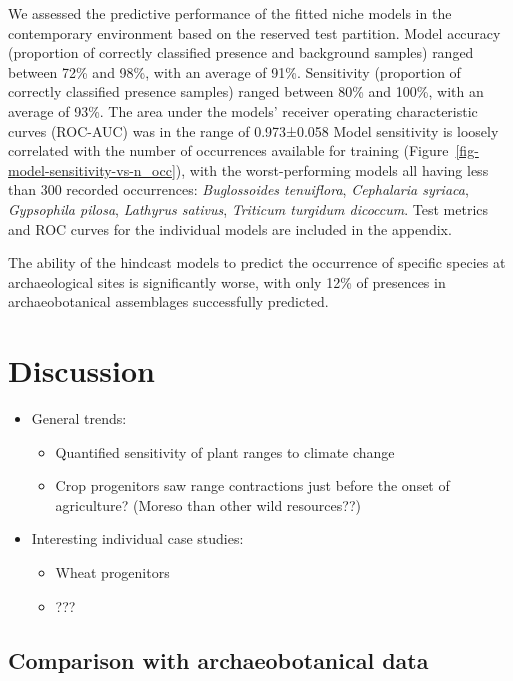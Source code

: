 \documentclass[
  authoryear,
  review]{elsarticle}
\providecommand{\tightlist}{%
  \setlength{\itemsep}{0pt}\setlength{\parskip}{0pt}}\usepackage{longtable,booktabs,array}
\begin{document}
We assessed the predictive performance of the fitted niche models in the
contemporary environment based on the reserved test partition. Model
accuracy (proportion of correctly classified presence and background
samples) ranged between 72\% and 98\%, with an average of 91\%.
Sensitivity (proportion of correctly classified presence samples) ranged
between 80\% and 100\%, with an average of 93\%. The area under the
models' receiver operating characteristic curves (ROC-AUC) was in the
range of 0.973±0.058 Model sensitivity is loosely correlated with the
number of occurrences available for training
(Figure~\ref{fig-model-sensitivity-vs-n_occ}), with the worst-performing
models all having less than 300 recorded occurrences: \emph{Buglossoides
tenuiflora}, \emph{Cephalaria syriaca}, \emph{Gypsophila pilosa},
\emph{Lathyrus sativus}, \emph{Triticum turgidum dicoccum}. Test metrics
and ROC curves for the individual models are included in the appendix.

The ability of the hindcast models to predict the occurrence of specific
species at archaeological sites is significantly worse, with only 12\%
of presences in archaeobotanical assemblages successfully predicted.

\section{Discussion}\label{discussion}

\begin{itemize}
\tightlist
\item
  General trends:

  \begin{itemize}
  \tightlist
  \item
    Quantified sensitivity of plant ranges to climate change
  \item
    Crop progenitors saw range contractions just before the onset of
    agriculture? (Moreso than other wild resources??)
  \end{itemize}
\item
  Interesting individual case studies:

  \begin{itemize}
  \tightlist
  \item
    Wheat progenitors
  \item
    ???
  \end{itemize}
\end{itemize}

\subsection{Comparison with archaeobotanical
data}\label{comparison-with-archaeobotanical-data}
\end{document}
